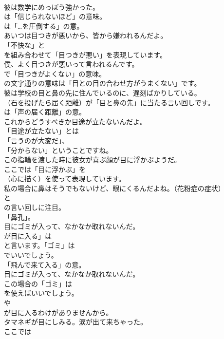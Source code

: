 \documentclass[8pt]{extreport}
\begin{document}
\begin{CJK}{UTF8}{min}
\\	彼は数学にめっぽう強かった。 
\\	は「信じられないほど」の意味。
\\	は「…を圧倒する」の意。	
\\	あいつは目つきが悪いから、皆から嫌われるんだよ。 
\\	「不快な」と
\\	を組み合わせて「目つきが悪い」を表現しています。	
\\	僕、よく目つきが悪いって言われるんです。 
\\	で「目つきがよくない」の意味。
\\	の文字通りの意味は「目との目の合わせ方がうまくない」です。	
\\	彼は学校の目と鼻の先に住んでいるのに、遅刻ばかりしている。 
\\	（石を投げたら届く距離）が「目と鼻の先」に当たる言い回しです。
\\	は「声の届く距離」の意。	
\\	これからどうすべきか目途が立たないんだよ。 
\\	「目途が立たない」とは
\\	「言うのが大変だ」、
\\	「分からない」ということですね。	
\\	この指輪を渡した時に彼女が喜ぶ顔が目に浮かぶようだ。 
\\	ここでは「目に浮かぶ」を
\\	（心に描く）を使って表現しています。	
\\	私の場合に鼻はそうでもないけど、眼にくるんだよね。（花粉症の症状） 
\\	と
\\	の言い回しに注目。
\\	「鼻孔」。	
\\	目にゴミが入って、なかなか取れないんだ。 
\\	が目に入る」は
\\	と言います。「ゴミ」は
\\	でいいでしょう。
\\	「飛んで来て入る」の意。	
\\	目にゴミが入って、なかなか取れないんだ。 
\\	この場合の「ゴミ」は
\\	を使えばいいでしょう。
\\	や
\\	が目に入るわけがありませんから。	
\\	タマネギが目にしみる。涙が出て来ちゃった。 
\\	ここでは

\end{CJK}
\end{document}
